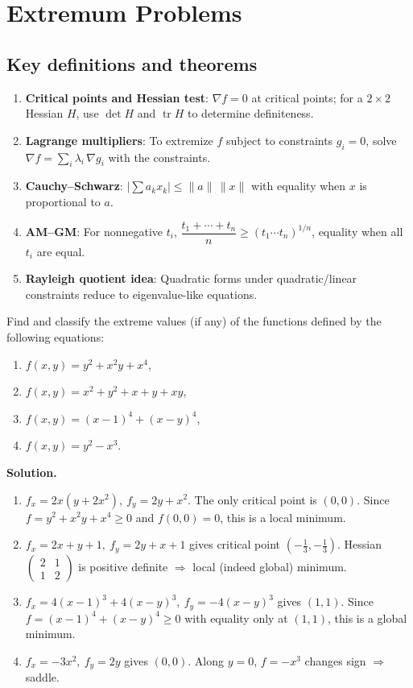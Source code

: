 \section{Extremum Problems}
\subsection*{Key definitions and theorems}
\begin{enumerate}[label=(\roman*)]
    \item \textbf{Critical points and Hessian test}: $\nabla f=0$ at critical points; for a $2\times2$ Hessian $H$, use $\det H$ and $\operatorname{tr} H$ to determine definiteness.
    \item \textbf{Lagrange multipliers}: To extremize $f$ subject to constraints $g_i=0$, solve $\nabla f=\sum_i \lambda_i\,\nabla g_i$ with the constraints.
    \item \textbf{Cauchy--Schwarz}: $\big|\sum a_k x_k\big|\le \|a\|\,\|x\|$ with equality when $x$ is proportional to $a$.
    \item \textbf{AM--GM}: For nonnegative $t_i$, $\dfrac{t_1+\cdots+t_n}{n}\ge (t_1\cdots t_n)^{1/n}$, equality when all $t_i$ are equal.
    \item \textbf{Rayleigh quotient idea}: Quadratic forms under quadratic/linear constraints reduce to eigenvalue-like equations.
\end{enumerate}
\begin{problembox}
Find and classify the extreme values (if any) of the functions defined by the following equations:
\begin{enumerate}[label=(\alph*)]
    \item \( f(x, y) = y^2 + x^2y + x^4 \),
    \item \( f(x, y) = x^2 + y^2 + x + y + xy \),
    \item \( f(x, y) = (x - 1)^4 + (x - y)^4 \),
    \item \( f(x, y) = y^2 - x^3 \).
\end{enumerate}
\end{problembox}

\noindent\textbf{Solution.}
\begin{enumerate}[label=(\alph*)]
    \item $f_x=2x(y+2x^2),\ f_y=2y+x^2$. The only critical point is $(0,0)$. Since $f=y^2+x^2y+x^4\ge 0$ and $f(0,0)=0$, this is a local minimum.
    \item $f_x=2x+y+1,\ f_y=2y+x+1$ gives critical point $(-\tfrac13,-\tfrac13)$. Hessian $\begin{pmatrix}2&1\\1&2\end{pmatrix}$ is positive definite $\Rightarrow$ local (indeed global) minimum.
    \item $f_x=4(x-1)^3+4(x-y)^3,\ f_y=-4(x-y)^3$ gives $(1,1)$. Since $f=(x-1)^4+(x-y)^4\ge0$ with equality only at $(1,1)$, this is a global minimum.
    \item $f_x=-3x^2,\ f_y=2y$ gives $(0,0)$. Along $y=0$, $f=-x^3$ changes sign $\Rightarrow$ saddle.
\end{enumerate}

